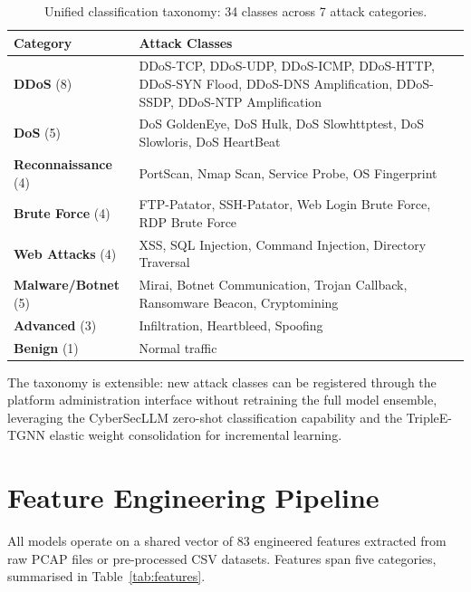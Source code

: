 \begin{table}[htbp]
\centering
\caption{Unified classification taxonomy: 34 classes across 7 attack categories.}
\label{tab:taxonomy}
\small
\begin{tabular}{p{2.5cm} p{10.5cm}}
\toprule
\textbf{Category} & \textbf{Attack Classes} \\
\midrule
\textbf{DDoS} (8) & DDoS-TCP, DDoS-UDP, DDoS-ICMP, DDoS-HTTP, DDoS-SYN Flood, DDoS-DNS Amplification, DDoS-SSDP, DDoS-NTP Amplification \\
\addlinespace
\textbf{DoS} (5) & DoS GoldenEye, DoS Hulk, DoS Slowhttptest, DoS Slowloris, DoS HeartBeat \\
\addlinespace
\textbf{Reconnaissance} (4) & PortScan, Nmap Scan, Service Probe, OS Fingerprint \\
\addlinespace
\textbf{Brute Force} (4) & FTP-Patator, SSH-Patator, Web Login Brute Force, RDP Brute Force \\
\addlinespace
\textbf{Web Attacks} (4) & XSS, SQL Injection, Command Injection, Directory Traversal \\
\addlinespace
\textbf{Malware/Botnet} (5) & Mirai, Botnet Communication, Trojan Callback, Ransomware Beacon, Cryptomining \\
\addlinespace
\textbf{Advanced} (3) & Infiltration, Heartbleed, Spoofing \\
\addlinespace
\textbf{Benign} (1) & Normal traffic \\
\bottomrule
\end{tabular}
\end{table}

The taxonomy is extensible: new attack classes can be registered through the platform administration interface without retraining the full model ensemble, leveraging the CyberSecLLM zero-shot classification capability and the TripleE-TGNN elastic weight consolidation for incremental learning.


\section{Feature Engineering Pipeline}
\label{sec:features}

All models operate on a shared vector of 83 engineered features extracted from raw PCAP files or pre-processed CSV datasets. Features span five categories, summarised in Table~\ref{tab:features}.

